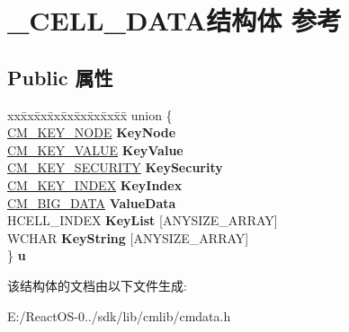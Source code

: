 \hypertarget{struct___c_e_l_l___d_a_t_a}{}\section{\+\_\+\+C\+E\+L\+L\+\_\+\+D\+A\+T\+A结构体 参考}
\label{struct___c_e_l_l___d_a_t_a}
\subsection*{Public 属性}
\begin{DoxyCompactItemize}
\item 
\mbox{\label{struct___c_e_l_l___d_a_t_a_a73a74b2df9cec3837c67d50fe943ebb3}} 
\begin{tabbing}
xx\=xx\=xx\=xx\=xx\=xx\=xx\=xx\=xx\=\kill
union \{\\
\>\hyperlink{struct___c_m___k_e_y___n_o_d_e}{CM\_KEY\_NODE} {\bfseries KeyNode}\\
\>\hyperlink{struct___c_m___k_e_y___v_a_l_u_e}{CM\_KEY\_VALUE} {\bfseries KeyValue}\\
\>\hyperlink{struct___c_m___k_e_y___s_e_c_u_r_i_t_y}{CM\_KEY\_SECURITY} {\bfseries KeySecurity}\\
\>\hyperlink{struct___c_m___k_e_y___i_n_d_e_x}{CM\_KEY\_INDEX} {\bfseries KeyIndex}\\
\>\hyperlink{struct___c_m___b_i_g___d_a_t_a}{CM\_BIG\_DATA} {\bfseries ValueData}\\
\>HCELL\_INDEX {\bfseries KeyList} \mbox{[}ANYSIZE\_ARRAY\mbox{]}\\
\>WCHAR {\bfseries KeyString} \mbox{[}ANYSIZE\_ARRAY\mbox{]}\\
\} {\bfseries u}\\

\end{tabbing}\end{DoxyCompactItemize}


该结构体的文档由以下文件生成\+:\begin{DoxyCompactItemize}
\item 
E\+:/\+React\+O\+S-\/0../sdk/lib/cmlib/cmdata.\+h\end{DoxyCompactItemize}
